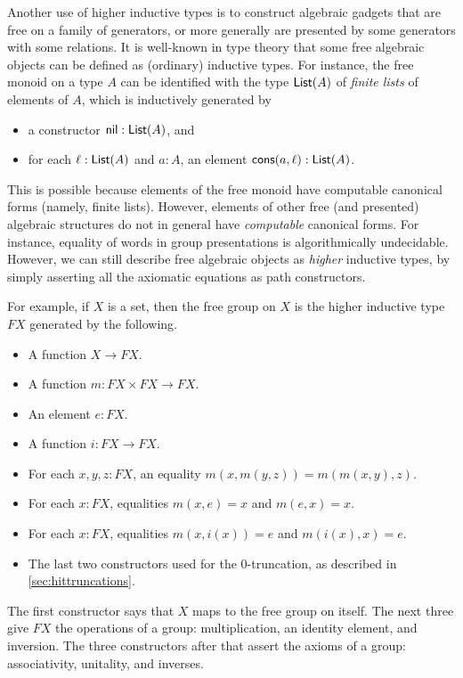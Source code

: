 Another use of higher inductive types is to construct algebraic gadgets that are free on a family of generators, or more generally are presented by some generators with some relations.
It is well-known in type theory that some free algebraic objects can be defined as (ordinary) inductive types.
For instance, the free monoid on a type $A$ can be identified with the type $\mathsf{List}(A)$ of \emph{finite lists} of elements of $A$, which is inductively generated by
\begin{itemize}
\item a constructor $\mathsf{nil}:\mathsf{List}(A)$, and
\item for each $\ell:\mathsf{List}(A)$ and $a:A$, an element $\mathsf{cons}(a,\ell):\mathsf{List}(A)$.
\end{itemize}
This is possible because elements of the free monoid have computable canonical forms (namely, finite lists).
However, elements of other free (and presented) algebraic structures do not in general have \emph{computable} canonical forms.
For instance, equality of words in group presentations is algorithmically undecidable.
However, we can still describe free algebraic objects as \emph{higher} inductive types, by simply asserting all the axiomatic equations as path constructors.

For example, if $X$ is a set, then the free group on $X$ is the higher inductive type $F X$ generated by the following.
\begin{itemize}
\item A function $X\to F X$.
\item A function $m: F X \times F X \to F X$.
\item An element $e:F X$.
\item A function $i:F X \to F X$.
\item For each $x,y,z:F X$, an equality $m(x,m(y,z)) = m(m(x,y),z)$.
\item For each $x:F X$, equalities $m(x,e) = x$ and $m(e,x) = x$.
\item For each $x:F X$, equalities $m(x,i(x)) = e$ and $m(i(x),x) = e$.
\item The last two constructors used for the 0-truncation, as described in \autoref{sec:hittruncations}.
\end{itemize}
The first constructor says that $X$ maps to the free group on itself.
The next three give $F X$ the operations of a group: multiplication, an identity element, and inversion.
The three constructors after that assert the axioms of a group: associativity, unitality, and inverses.

